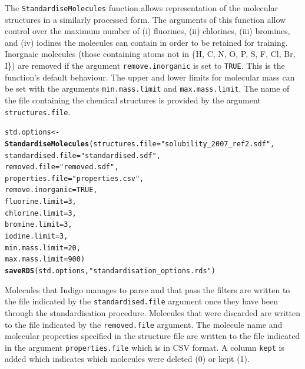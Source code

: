 \documentclass[twoside,a4wide,12pt]{article}\usepackage[]{graphicx}\usepackage[]{color}
\makeatletter
\newcommand{\hlnum}[1]{\textcolor[rgb]{0.686,0.059,0.569}{#1}}%
\newcommand{\hlstr}[1]{\textcolor[rgb]{0.192,0.494,0.8}{#1}}%
\newcommand{\hlstd}[1]{\textcolor[rgb]{0.345,0.345,0.345}{#1}}%
\newcommand{\hlkwb}[1]{\textcolor[rgb]{0.69,0.353,0.396}{#1}}%
\newcommand{\hlkwc}[1]{\textcolor[rgb]{0.333,0.667,0.333}{#1}}%
\newcommand{\hlkwd}[1]{\textcolor[rgb]{0.737,0.353,0.396}{\textbf{#1}}}%
\newenvironment{kframe}{%
 \def\at@end@of@kframe{}%
 \ifinner\ifhmode%
  \def\at@end@of@kframe{\end{minipage}}%
  \begin{minipage}{\columnwidth}%
 \fi\fi%
 \def\FrameCommand##1{\hskip\@totalleftmargin \hskip-\fboxsep
 \colorbox{shadecolor}{##1}\hskip-\fboxsep
     \hskip-\linewidth \hskip-\@totalleftmargin \hskip\columnwidth}%
 \MakeFramed {\advance\hsize-\width
   \@totalleftmargin\z@ \linewidth\hsize
   \@setminipage}}%
 {\par\unskip\endMakeFramed%
 \at@end@of@kframe}
\newenvironment{knitrout}{}{} %
\makeatother
\begin{document}
The \texttt{StandardiseMolecules} function allows representation of the molecular structures in a similarly processed form.
The arguments of this function allow control over the maximum number of (i) fluorines, (ii) chlorines,
(iii) bromines, and (iv) iodines the molecules can contain in order to be retained for training.
Inorgnaic molecules (those containing atoms not in \{H, C, N, O, P, S, F, Cl, Br, I\}) are removed if the argument \texttt{remove.inorganic} is set to \texttt{TRUE}. This is the function's default behaviour.
The upper and lower limits for molecular mass can be set with the arguments \texttt{min.mass.limit} and \texttt{max.mass.limit}.
The name of the file containing the chemical structures is provided by the argument \texttt{structures.file}.
\begin{knitrout}
\color{fgcolor}\begin{kframe}
\begin{alltt}
\hlstd{std.options} \hlkwb{<-} \hlkwd{StandardiseMolecules}\hlstd{(}\hlkwc{structures.file}\hlstd{=}\hlstr{"solubility_2007_ref2.sdf"}\hlstd{,}
                                                \hlkwc{standardised.file}\hlstd{=}\hlstr{"standardised.sdf"}\hlstd{,}
                                                \hlkwc{removed.file}\hlstd{=}\hlstr{"removed.sdf"}\hlstd{,}
                                                \hlkwc{properties.file} \hlstd{=} \hlstr{"properties.csv"}\hlstd{,}
                                                \hlkwc{remove.inorganic}\hlstd{=}\hlnum{TRUE}\hlstd{,}
                                                \hlkwc{fluorine.limit}\hlstd{=}\hlnum{3}\hlstd{,}
                                                \hlkwc{chlorine.limit}\hlstd{=}\hlnum{3}\hlstd{,}
                                                \hlkwc{bromine.limit}\hlstd{=}\hlnum{3}\hlstd{,}
                                                \hlkwc{iodine.limit}\hlstd{=}\hlnum{3}\hlstd{,}
                                                \hlkwc{min.mass.limit}\hlstd{=}\hlnum{20}\hlstd{,}
                                                \hlkwc{max.mass.limit}\hlstd{=}\hlnum{900}\hlstd{)}
\hlkwd{saveRDS}\hlstd{(std.options,} \hlstr{"standardisation_options.rds"}\hlstd{)}
\end{alltt}
\end{kframe}
\end{knitrout}
Molecules that Indigo manages to parse and that pass the filters are written to the file indicated by the \texttt{standardised.file} argument once they have been through the standardisation procedure. Molecules that were discarded are written to the file indicated by the \texttt{removed.file} argument. The molecule name and molecular properties specified in the structure file are written to the file indicated in the argument \texttt{properties.file} which is in CSV format. A column \texttt{kept} is added which indicates which molecules were deleted (0) or kept (1).
\end{document}
